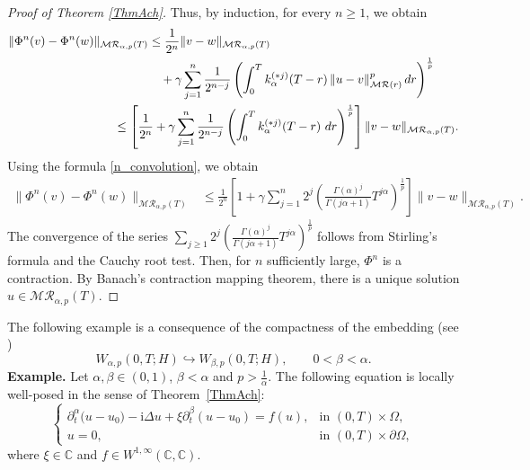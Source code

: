 \documentclass[reqno]{amsart}
\numberwithin{equation}{section}
\begin{document}
\begin{proof}[Proof of Theorem \ref{ThmAch}]
Thus, by induction, for every $n\ge 1$, we obtain
\begin{align*}
     \|\Phi^n(v)-\Phi^n(w)\|_{\mathcal{M}\mathcal{R}_{\alpha,p}(T)}
&\le \frac{1}{2^n}\|v-w\|_{\mathcal{M}\mathcal{R}_{\alpha,p}(T)}  \\
&\quad + \gamma
\sum_{j=1}^{n}
\frac{1}{2^{n-j}}
\left(
\int_0^T k_\alpha^{(*j)}(T-r)\,
\|u-v\|_{\mathcal{MR}(r)}^p\,dr
\right)^{\frac{1}{p}}\\
&\hspace{-1cm}\le \left[\frac{1}{2^n}+ \gamma
\sum_{j=1}^{n}
\frac{1}{2^{n-j}}
\left(
\int_0^T k_\alpha^{(*j)}(T-r)\,
\,dr
\right)^{\frac{1}{p}}\right]\|v-w\|_{\mathcal{M}\mathcal{R}_{\alpha,p}(T)}.  
 \end{align*}
 Using the formula \eqref{n_convolution}, we obtain
 \begin{align*}
     \|\Phi^n(v)-\Phi^n(w)\|_{\mathcal{M}\mathcal{R}_{\alpha,p}(T)}
&\le \frac{1}{2^{n}}\left[1+ \gamma
\sum_{j=1}^{n}
2^{j}
\left(
\frac{\Gamma(\alpha)^j}{\Gamma(j\alpha+1)}T^{j\alpha}
\right)^{\frac{1}{p}}\right]\|v-w\|_{\mathcal{M}\mathcal{R}_{\alpha,p}(T)}.
 \end{align*}
The convergence of the series $\displaystyle \sum_{j\ge 1}
2^{j}
\left(
\frac{\Gamma(\alpha)^j}{\Gamma(j\alpha+1)}T^{j\alpha}
\right)^{\frac{1}{p}}$ follows from Stirling's formula and the Cauchy root test. Then, for $n$ sufficiently large, 
$\Phi^n$ is a contraction. By Banach's contraction mapping theorem, there is a unique solution $u\in \mathcal{M}\mathcal{R}_{\alpha,p}(T).$
\end{proof}
The following example is a consequence of the compactness of the embedding (see \cite[Theorem 2.1~(iii)]{YaLp22})
$$
W_{\alpha,p}(0,T;H) \hookrightarrow W_{\beta,p}(0,T;H), 
\qquad 0 < \beta < \alpha.$$
\textbf{Example.} Let $\alpha, \beta\in (0,1)$, $\beta<\alpha$ and $p>\frac{1}{\alpha}$. The following equation is locally well-posed in the sense of Theorem~\ref{ThmAch}:
\begin{equation*}
\begin{cases}
\partial_t^\alpha \big(u-u_0\big) -\mathrm{i} \Delta u
+ \xi \partial_t^\beta (u-u_0)=f(u), 
& \text{in } (0,T)\times \Omega,\\
u = 0, & \text{in } (0,T)\times \partial \Omega,
\end{cases}
\end{equation*}
where $\xi\in\mathbb{C}$ and $f\in W^{1,\infty}(\mathbb{C},\mathbb{C})$.
\end{document}
